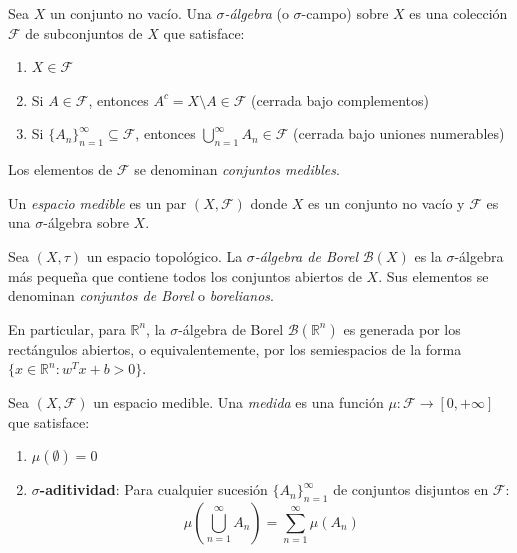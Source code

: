 \begin{definition}\label{def:sigma_algebra}
	Sea $X$ un conjunto no vacío. Una \textit{$\sigma$-álgebra} (o $\sigma$-campo) sobre $X$ es una colección $\mathcal{F}$ de subconjuntos de $X$ que satisface:
	\begin{enumerate}
		\item $X \in \mathcal{F}$
		\item Si $A \in \mathcal{F}$, entonces $A^c = X \setminus A \in \mathcal{F}$ (cerrada bajo complementos)
		\item Si $\{A_n\}_{n=1}^\infty \subseteq \mathcal{F}$, entonces $\bigcup_{n=1}^\infty A_n \in \mathcal{F}$ (cerrada bajo uniones numerables)
	\end{enumerate}
	Los elementos de $\mathcal{F}$ se denominan \textit{conjuntos medibles}.
\end{definition}

\begin{definition}\label{def:espacio_medible}
	Un \textit{espacio medible} es un par $(X, \mathcal{F})$ donde $X$ es un conjunto no vacío y $\mathcal{F}$ es una $\sigma$-álgebra sobre $X$.
\end{definition}

\begin{definition}\label{def:sigma_algebra_borel}
	Sea $(X, \tau)$ un espacio topológico. La \textit{$\sigma$-álgebra de Borel} $\mathcal{B}(X)$ es la $\sigma$-álgebra más pequeña que contiene todos los conjuntos abiertos de $X$. Sus elementos se denominan \textit{conjuntos de Borel} o \textit{borelianos}.
\end{definition}

En particular, para $\mathbb{R}^n$, la $\sigma$-álgebra de Borel $\mathcal{B}(\mathbb{R}^n)$ es generada por los rectángulos abiertos, o equivalentemente, por los semiespacios de la forma $\{x \in \mathbb{R}^n : w^T x + b > 0\}$.

\begin{definition}[Medida]\label{def:medida}
	Sea $(X, \mathcal{F})$ un espacio medible. Una \textit{medida} es una función $\mu: \mathcal{F} \to [0, +\infty]$ que satisface:
	\begin{enumerate}
		\item $\mu(\emptyset) = 0$
		\item \textbf{$\sigma$-aditividad}: Para cualquier sucesión $\{A_n\}_{n=1}^\infty$ de conjuntos disjuntos en $\mathcal{F}$:
		\[
			\mu\left(\bigcup_{n=1}^\infty A_n\right) = \sum_{n=1}^\infty \mu(A_n)
		\]
	\end{enumerate}
\end{definition}

